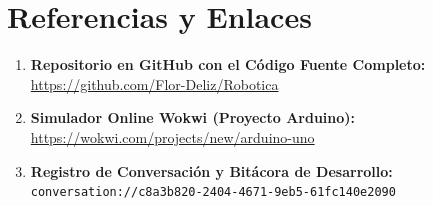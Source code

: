 \documentclass[12pt,a4paper]{article}
\begin{document}
\section{Referencias y Enlaces}
\begin{enumerate}
    \item \textbf{Repositorio en GitHub con el Código Fuente Completo:}\\
    \url{https://github.com/Flor-Deliz/Robotica}
    
    \item \textbf{Simulador Online Wokwi (Proyecto Arduino):}\\
    \url{https://wokwi.com/projects/new/arduino-uno}

    \item \textbf{Registro de Conversación y Bitácora de Desarrollo:}\\
    \texttt{conversation://c8a3b820-2404-4671-9eb5-61fc140e2090}
\end{enumerate}
\end{document}
